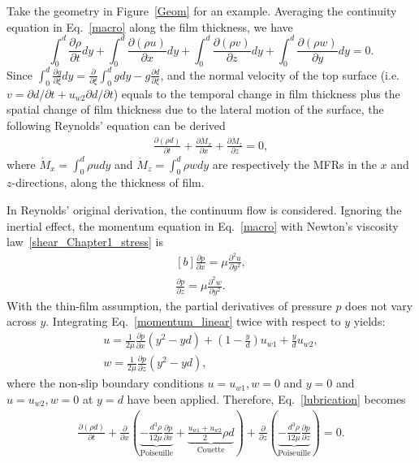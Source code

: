 Take the geometry in Figure~\ref{Geom} for an example. Averaging the continuity equation in Eq.~\eqref{macro} along the film thickness, we have
\begin{equation} 
 \int_{0}^{d} \frac{\partial \rho}{\partial t}dy
+\int_{0}^{d} \frac{\partial (\rho{}u)}{\partial x}dy 
+\int_{0}^{d} \frac{\partial (\rho{}v)}{\partial z}dy
+\int_{0}^{d} \frac{\partial (\rho{}w)}{\partial y}dy=0.
\end{equation} 
Since $\int_{0}^{d} \frac{\partial g}{\partial \xi} dy=\frac{\partial }{\partial \xi} \int_{0}^{d} g dy-g  \frac{\partial d}{\partial \xi}$, and the normal velocity of the top surface (i.e. $v=\partial d/\partial t+u_{w2}\partial d/\partial t$) equals to the temporal change in film thickness plus the spatial change of film thickness due to the lateral motion of the surface, the following Reynolds' equation can be derived
\begin{eqnarray}\label{lubrication} 
\frac{\partial (\rho{}d)}{\partial t}
+\frac{\partial \dot{M}_x}{\partial x}
+\frac{\partial \dot{M}_z}{\partial z}  
=0,
\end{eqnarray} 
where $\dot{M}_x=\int_0^d\rho{}udy$ and $\dot{M}_z=\int_0^d\rho{}wdy$ are respectively the MFRs in the $x$ and $z$-directions, along the thickness of film.

In Reynolds' original derivation, the continuum flow is considered.
Ignoring the inertial effect, the momentum equation in Eq.~\eqref{macro} with Newton's viscosity law~\eqref{shear_Chapter1_stress} is
\begin{equation} \label{momentum_linear}
\begin{aligned}[b]
\frac{\partial p}{\partial x} = \mu\frac{\partial^{2} u}{\partial y^{2}}, \\
\frac{\partial p}{\partial z} = \mu\frac{\partial^{2} w}{\partial y^{2}}.
\end{aligned}
\end{equation} 
With the thin-film assumption, the partial derivatives of pressure $p$ does not vary across $y$. Integrating Eq.~\eqref{momentum_linear} twice with respect to $y$ yields:
\begin{eqnarray} u = \frac{1}{2\mu}\frac{\partial p}{\partial x}(y^2 - yd) + \left(1 - \frac{y}{d}\right)u_{w1}+\frac{y}{d}u_{w2}, \\
w = \frac{1}{2\mu}\frac{\partial p}{\partial z}(y^2 - yd),
\end{eqnarray} 
where the non-slip boundary conditions $u = u_{w1}, w = 0$ and $y = 0$ and  $u =u_{w2}, w = 0$ at $y = d$ have been applied. Therefore, Eq.~\eqref{lubrication} becomes 
\begin{eqnarray} 
\frac{\partial (\rho{}d)}{\partial t}
+\frac{\partial}{\partial x}
\left(
\underbrace{-\frac{d^3\rho}{12\mu}\frac{\partial p}{\partial x}}_{\text{Poiseuille}}
+\underbrace{\frac{u_{w1}+u_{w2}}{2}\rho{}d}_{\text{Couette}}
\right) 
+ \frac{\partial}{\partial z}\left(\underbrace{-\frac{d^3\rho}{12\mu}\frac{\partial p}{\partial z}}_{\text{Poiseuille}}\right)
=0.
\end{eqnarray} 


